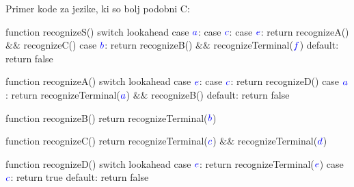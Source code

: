 \documentclass{article}
\newcommand{\Symbol}[1]{\textcolor{blue}{#1}}
\begin{document}
\newpage
Primer kode za jezike, ki so bolj podobni C:
\begin{algorithm}
  function recognizeS()
    switch lookahead
      case $\Symbol{a}$:
      case $\Symbol{c}$:
      case $\Symbol{e}$:
        return recognizeA() $\&\&$ recognizeC()
      case $\Symbol{b}$:
        return recognizeB() $\&\&$ recognizeTerminal($\Symbol{f}$)
      default:
        return false

  function recognizeA()
     switch lookahead
      case $\Symbol{e}$:
      case $\Symbol{c}$:
        return recognizeD()
      case $\Symbol{a}$:
        return recognizeTerminal($\Symbol{a}$) $\&\&$ recognizeB()
      default:
        return false

  function recognizeB()
    return recognizeTerminal($\Symbol{b}$)

  function recognizeC()
    return recognizeTerminal($\Symbol{c}$) $\&\&$ recognizeTerminal($\Symbol{d}$)

  function recognizeD()
    switch lookahead
      case $\Symbol{e}$:
        return recognizeTerminal($\Symbol{e}$)
      case $\Symbol{c}$:
        return true
      default:
        return false
\end{algorithm}

\printbibliography
\end{document}
